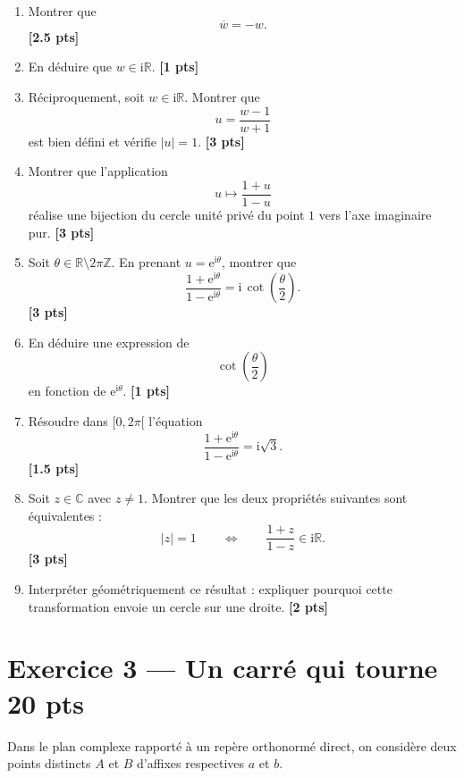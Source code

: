 \documentclass[11pt,a4paper]{article}
\newcommand{\C}{\mathbb{C}}
\newcommand{\R}{\mathbb{R}}
\newcommand{\ii}{\mathrm{i}}
\newcommand{\e}{\mathrm{e}}
\newcommand{\bareme}[1]{\hfill{\small\textbf{[#1 pts]}}}
\begin{document}
\begin{enumerate}[label=\textbf{\arabic*.}]
    \item Montrer que
    \[
    \overline w=-w.
    \]
    \bareme{2.5}

    \item En déduire que \(w\in \ii\R\).
    \bareme{1}

    \item Réciproquement, soit \(w\in \ii\R\). Montrer que
    \[
    u=\frac{w-1}{w+1}
    \]
    est bien défini et vérifie \(|u|=1\).
    \bareme{3}

    \item Montrer que l'application
    \[
    u\longmapsto \frac{1+u}{1-u}
    \]
    réalise une bijection du cercle unité privé du point \(1\) vers l'axe imaginaire pur.
    \bareme{3}

    \item Soit \(\theta\in\R\setminus 2\pi\mathbb{Z}\). En prenant \(u=\e^{\ii\theta}\), montrer que
    \[
    \frac{1+\e^{\ii\theta}}{1-\e^{\ii\theta}}
    =\ii\,\cot\!\left(\frac{\theta}{2}\right).
    \]
    \bareme{3}

    \item En déduire une expression de
    \[
    \cot\!\left(\frac{\theta}{2}\right)
    \]
    en fonction de \(\e^{\ii\theta}\).
    \bareme{1}

    \item Résoudre dans \([0,2\pi[\) l'équation
    \[
    \frac{1+\e^{\ii\theta}}{1-\e^{\ii\theta}}=\ii\sqrt3.
    \]
    \bareme{1.5}

    \item Soit \(z\in\C\) avec \(z\neq 1\). Montrer que les deux propriétés suivantes sont équivalentes :
    \[
    |z|=1
    \qquad\Longleftrightarrow\qquad
    \frac{1+z}{1-z}\in \ii\R.
    \]
    \bareme{3}

    \item Interpréter géométriquement ce résultat : expliquer pourquoi cette transformation envoie un cercle sur une droite.
    \bareme{2}
\end{enumerate}

\bigskip

\section*{Exercice 3 --- Un carré qui tourne \hfill \textbf{20 pts}}

Dans le plan complexe rapporté à un repère orthonormé direct, on considère deux points distincts \(A\) et \(B\) d'affixes respectives \(a\) et \(b\).
\end{document}

